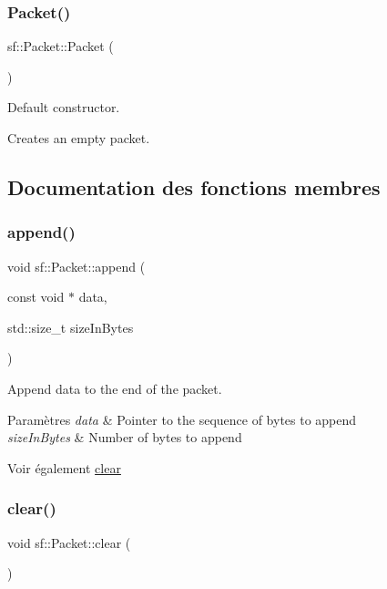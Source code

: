 \subsubsection{\texorpdfstring{Packet()}{Packet()}}
{\footnotesize\ttfamily sf\+::\+Packet\+::\+Packet (\begin{DoxyParamCaption}{ }\end{DoxyParamCaption})}



Default constructor. 

Creates an empty packet. 

\subsection{Documentation des fonctions membres}
\mbox{\label{classsf_1_1Packet_a7dd6e429b87520008326c4d71f1cf011}} 
\subsubsection{\texorpdfstring{append()}{append()}}
{\footnotesize\ttfamily void sf\+::\+Packet\+::append (\begin{DoxyParamCaption}\item[{const void $\ast$}]{data,  }\item[{std\+::size\+\_\+t}]{size\+In\+Bytes }\end{DoxyParamCaption})}



Append data to the end of the packet. 


\begin{DoxyParams}{Paramètres}
{\em data} & Pointer to the sequence of bytes to append \\
\hline
{\em size\+In\+Bytes} & Number of bytes to append\\
\hline
\end{DoxyParams}
\begin{DoxySeeAlso}{Voir également}
\hyperlink{classsf_1_1Packet_a133ea8b8fe6e93c230f0d79f19a3bf0d}{clear} 
\end{DoxySeeAlso}
\mbox{\label{classsf_1_1Packet_a133ea8b8fe6e93c230f0d79f19a3bf0d}} 
\subsubsection{\texorpdfstring{clear()}{clear()}}
{\footnotesize\ttfamily void sf\+::\+Packet\+::clear (\begin{DoxyParamCaption}{ }\end{DoxyParamCaption})}



